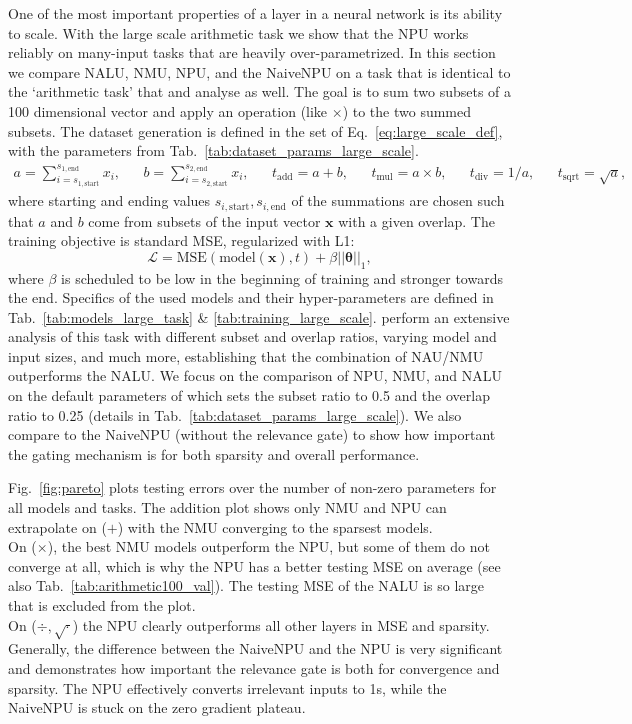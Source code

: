 \documentclass[9pt]{article}
\begin{document}
One of the most important properties of a layer in a neural network is its
ability to scale. With the large scale arithmetic task we show that the NPU
works reliably on many-input tasks that are heavily over-parametrized.  In this
section we compare NALU, NMU, NPU, and the NaiveNPU on a task that is identical
to the `arithmetic task' that \cite{madsen_neural_2020} and
\cite{trask_neural_2018} analyse as well.
The goal is to sum two subsets of a 100 dimensional vector and
apply an operation (like $\times$) to the two summed subsets.  The dataset
generation is defined in the set of Eq.~\ref{eq:large_scale_def}, with the
parameters from Tab.~\ref{tab:dataset_params_large_scale}.
\begin{align}
  \label{eq:large_scale_def}
  a = \sum_{i=s_{1,\text{start}}}^{s_{1,\text{end}}} x_i, &&
  b = \sum_{i=s_{2,\text{start}}}^{s_{2,\text{end}}} x_i, &&
  t_{\text{add}} = a + b, && t_{\text{mul}} = a \times b, &&
  t_{\text{div}} = 1 / a, && t_{\text{sqrt}} = \sqrt{a},
\end{align}
where starting and ending values $s_{i,\text{start}},s_{i,\text{end}}$ of the
summations are chosen such that $a$ and $b$ come from subsets of the input
vector $\bm x$ with a given overlap.  The training objective is standard MSE,
regularized with L1:
\begin{equation}
  \mathcal{L} = \text{MSE}(\text{model}(\bm x), t) + \beta||\bm\theta||_1,
\end{equation}
where $\beta$ is scheduled to be low in the beginning of training and stronger
towards the end.  Specifics of the used models and their hyper-parameters are defined in
Tab.~\ref{tab:models_large_task} \& \ref{tab:training_large_scale}.  \cite{madsen_neural_2020} perform an
extensive analysis of this task with different subset and overlap ratios,
varying model and input sizes, and much more, establishing that the combination
of NAU/NMU outperforms the NALU. We focus on the
comparison of NPU, NMU, and NALU on the default parameters of
\cite{madsen_neural_2020} which sets the subset ratio to 0.5 and the overlap
ratio to 0.25 (details in Tab.~\ref{tab:dataset_params_large_scale}).
We also compare to the NaiveNPU (without the relevance gate) to show
how important the gating mechanism is for both sparsity and overall
performance.

Fig.~\ref{fig:pareto} plots testing errors over the number of non-zero
parameters for all models and tasks.  The addition plot shows only NMU and NPU
can extrapolate on ($+$) with the NMU converging to the sparsest models.\\
On ($\times$), the best NMU models outperform the NPU, but some of them do not
converge at all, which is why the NPU has a better testing MSE on average (see
also Tab.~\ref{tab:arithmetic100_val}). The testing MSE of the NALU is so large
that is excluded from the plot.\\
On ($\div,\sqrt{\cdot}$) the NPU clearly outperforms all other layers
in MSE and sparsity. Generally, the difference between the NaiveNPU and the NPU
is very significant and demonstrates how important the relevance gate is both
for convergence and sparsity. The NPU effectively converts irrelevant inputs
to 1s, while the NaiveNPU is stuck on the zero gradient plateau.
\end{document}
